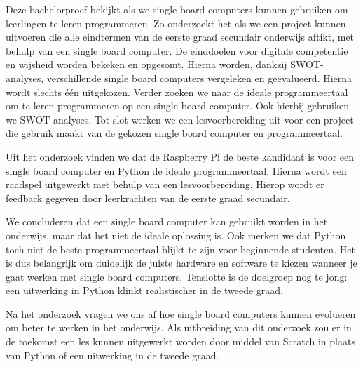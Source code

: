 Deze bachelorproef bekijkt als we single board computers kunnen gebruiken om leerlingen te leren programmeren. Zo onderzoekt het als we een project kunnen uitvoeren die alle eindtermen van de eerste graad secundair onderwijs aftikt, met behulp van een single board computer. De einddoelen voor digitale competentie en wijsheid worden bekeken en opgesomt. Hierna worden, dankzij SWOT-analyses, verschillende single board computers vergeleken en geëvalueerd. Hierna wordt slechts één uitgekozen. Verder zoeken we naar de ideale programmeertaal om te leren programmeren op een single board computer. Ook hierbij gebruiken we SWOT-analyses. Tot slot werken we een lesvoorbereiding uit voor een project die gebruik maakt van de gekozen single board computer en programmeertaal.

Uit het onderzoek vinden we dat de Raspberry Pi de beste kandidaat is voor een single board computer en Python de ideale programmeertaal. Hierna wordt een raadspel uitgewerkt met behulp van een lesvoorbereiding. Hierop wordt er feedback gegeven door leerkrachten van de eerste graad secundair.

We concluderen dat een single board computer kan gebruikt worden in het onderwijs, maar dat het niet de ideale oplossing is. Ook merken we dat Python toch niet de beste programmeertaal blijkt te zijn voor beginnende studenten. Het is dus belangrijk om duidelijk de juiste hardware en software te kiezen wanneer je gaat werken met single board computers. Tenslotte is de doelgroep nog te jong: een uitwerking in Python klinkt realistischer in de tweede graad.

Na het onderzoek vragen we ons af hoe single board computers kunnen evolueren om beter te werken in het onderwijs. Als uitbreiding van dit onderzoek zou er in de toekomst een les kunnen uitgewerkt worden door middel van Scratch in plaats van Python of een uitwerking in de tweede graad.
